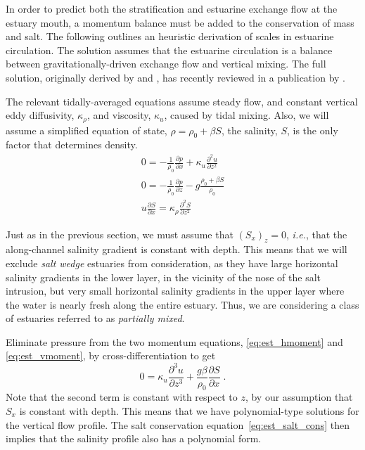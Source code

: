 \documentclass[11pt]{report}
\numberwithin{equation}{section}
\begin{document}
In order to predict both the stratification and estuarine exchange flow at the estuary mouth, a momentum balance must be added to the conservation of mass and salt. The following outlines an heuristic derivation of scales in estuarine circulation.  The solution assumes that the estuarine circulation is a balance between gravitationally-driven exchange flow and vertical mixing.  The full solution, originally derived by \citet{hansen.rattray:65} and \citet{chatwin:76}, has recently reviewed in a publication by \citet{maccready.geyer:10}.

The relevant tidally-averaged equations assume steady flow, and constant vertical eddy diffusivity, $\kappa_\rho$, and viscosity, $\kappa_u$, caused by tidal mixing.  Also, we will assume a simplified equation of state, $\rho = \rho_0 + \beta S$, the salinity, $S$, is the only factor that determines density.
\begin{align}
    0 = -\frac{1}{\rho_0}\frac{\partial p}{\partial x} + \kappa_u \frac{\partial^2 u}{\partial z^2}
        \label{eq:est_hmoment} \\
    0 =  -\frac{1}{\rho_0}\frac{\partial p}{\partial z} - g\frac{\rho_0 + \beta S}{\rho_0}
        \label{eq:est_vmoment} \\
    u\frac{\partial S}{\partial x} = \kappa_\rho \frac{\partial^2 S}{\partial z^2}
        \label{eq:est_salt_cons}
\end{align}

Just as in the previous section, we must assume that $(S_x)_z = 0$, \emph{i.e.}, that the along-channel salinity gradient is constant with depth.  This means that we will exclude \emph{salt wedge} estuaries from consideration, as they have large horizontal salinity gradients in the lower layer, in the vicinity of the nose of the salt intrusion, but very small horizontal salinity gradients in the upper layer where the water is nearly fresh along the entire estuary.  Thus, we are considering a class of estuaries referred to as \emph{partially mixed}.  

Eliminate pressure from the two momentum equations, \ref{eq:est_hmoment} and \ref{eq:est_vmoment}, by cross-differentiation to get
\begin{equation}
    0 = \kappa_u \frac{\partial^3 u}{\partial z^3} + \frac{g \beta}{\rho_0}\frac{\partial S}{\partial x} \; .     \label{eq:est_moments}
\end{equation}
Note that the second term is constant with respect to $z$, by our assumption that $S_x$ is constant with depth.  This means that we have polynomial-type solutions for the vertical flow profile.  The salt conservation equation~\ref{eq:est_salt_cons} then implies that the salinity profile also has a polynomial form.
\end{document}
